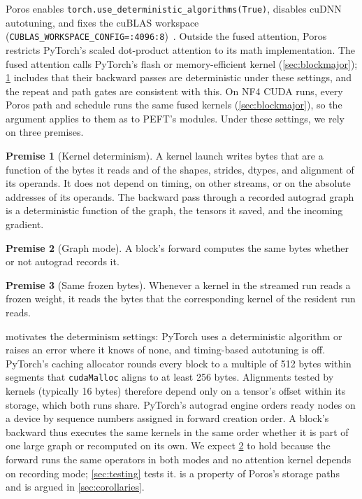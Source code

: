 \documentclass[11pt,letterpaper]{article}
\theoremstyle{definition}
\newtheorem{premise}{Premise}
\theoremstyle{plain}
\newcommand{\code}[1]{\texttt{\small #1}}
\begin{document}
Poros enables \code{torch.use\_deterministic\_algorithms(True)}, disables
cuDNN autotuning, and fixes the cuBLAS workspace
(\code{CUBLAS\_WORKSPACE\_CONFIG=:4096:8})~\cite{pytorch_repro}.
Outside the fused attention, Poros restricts PyTorch's scaled dot-product
attention to its math implementation.
The fused attention calls PyTorch's flash or memory-efficient kernel
(\cref{sec:blockmajor}); \cref{p:det} includes that their backward passes
are deterministic under these settings, and the repeat and path gates are
consistent with this.
On NF4 CUDA runs, every Poros path and schedule runs the same fused
kernels (\cref{sec:blockmajor}), so the argument applies to them as to
PEFT's modules.
Under these settings, we rely on three premises.

\begin{premise}[Kernel determinism]\label{p:det}
A kernel launch writes bytes that are a function of the bytes it reads
and of the shapes, strides, dtypes, and alignment of its operands.
It does not depend on timing, on other streams, or on the absolute
addresses of its operands.
The backward pass through a recorded autograd graph is a deterministic
function of the graph, the tensors it saved, and the incoming gradient.
\end{premise}

\begin{premise}[Graph mode]\label{p:grad}
A block's forward computes the same bytes whether or not autograd records
it.
\end{premise}

\begin{premise}[Same frozen bytes]\label{p:bytes}
Whenever a kernel in the streamed run reads a frozen weight, it reads the
bytes that the corresponding kernel of the resident run reads.
\end{premise}

 motivates the determinism settings: PyTorch uses a
deterministic algorithm or raises an error where it knows of none, and
timing-based autotuning is off.
PyTorch's caching allocator rounds every block to a multiple of 512 bytes
within segments that \code{cudaMalloc} aligns to at least 256 bytes.
Alignments tested by kernels (typically 16 bytes) therefore depend only
on a tensor's offset within its storage, which both runs share.
PyTorch's autograd engine orders ready nodes on a device by sequence
numbers assigned in forward creation order.
A block's backward thus executes the same kernels in the same order
whether it is part of one large graph or recomputed on its own.
We expect \cref{p:grad} to hold because the forward runs the same
operators in both modes and no attention kernel depends on recording
mode; \cref{sec:testing} tests it.
 is a property of Poros's storage paths and is argued in
\cref{sec:corollaries}.
\end{document}
